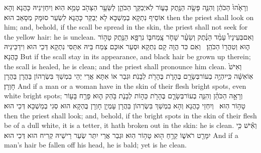 {וְרָאָ֙הוּ֙ הַכֹּהֵ֔ן וְהִנֵּ֛ה פָּשָׂ֥ה הַנֶּ֖תֶק בָּע֑וֹר לֹֽא\maqqaf יְבַקֵּ֧ר הַכֹּהֵ֛ן לַשֵּׂעָ֥ר הַצָּהֹ֖ב טָמֵ֥א הֽוּא׃}
{וְיִחְזֵינֵיהּ כָּהֲנָא וְהָא אוֹסֵיף נִתְקָא בְמַשְׁכָּא לָא יְבַקַּר כָּהֲנָא לִשְׂעַר סוּמָּק מְסָאַב הוּא׃}
{then the priest shall look on him; and, behold, if the scall be spread in the skin, the priest shall not seek for the yellow hair: he is unclean.}{}
{וְאִם\maqqaf בְּעֵינָיו֩ עָמַ֨ד הַנֶּ֜תֶק וְשֵׂעָ֨ר שָׁחֹ֧ר צָֽמַח\maqqaf בּ֛וֹ נִרְפָּ֥א הַנֶּ֖תֶק טָה֣וֹר ה֑וּא וְטִהֲר֖וֹ הַכֹּהֵֽן׃ \setuma }
{וְאִם כִּד הֲוָה קָם נִתְקָא וּסְעַר אוּכָּם צְמַח בֵּיהּ אִתַּסִּי נִתְקָא דְּכֵי הוּא וִידַכֵּינֵיהּ כָּהֲנָא׃}
{But if the scall stay in its appearance, and black hair be grown up therein; the scall is healed, he is clean; and the priest shall pronounce him clean.}{}
{וְאִישׁ֙ אֽוֹ\maqqaf אִשָּׁ֔ה כִּֽי\maqqaf יִהְיֶ֥ה בְעוֹר\maqqaf בְּשָׂרָ֖ם בֶּהָרֹ֑ת בֶּהָרֹ֖ת לְבָנֹֽת׃}
{וּגְבַר אוֹ אִתָּא אֲרֵי יְהֵי בִמְשַׁךְ בִּשְׂרְהוֹן בַּהֲרָן בַּהֲרָן חָוְרָן׃}
{And if a man or a woman have in the skin of their flesh bright spots, even white bright spots;}{}
{וְרָאָ֣ה הַכֹּהֵ֗ן וְהִנֵּ֧ה בְעוֹר\maqqaf בְּשָׂרָ֛ם בֶּהָרֹ֖ת כֵּה֣וֹת לְבָנֹ֑ת בֹּ֥הַק ה֛וּא פָּרַ֥ח בָּע֖וֹר טָה֥וֹר הֽוּא׃ \setuma }
{וְיִחְזֵי כָהֲנָא וְהָא בִמְשַׁךְ בִּשְׂרְהוֹן בַּהֲרָן עָמְיָן חָוְרָן בֻּהְקָא הוּא סְגִי בְמַשְׁכָּא דְּכֵי הוּא׃}
{then the priest shall look; and, behold, if the bright spots in the skin of their flesh be of a dull white, it is a tetter, it hath broken out in the skin: he is clean.}{}
{וְאִ֕ישׁ כִּ֥י יִמָּרֵ֖ט רֹאשׁ֑וֹ קֵרֵ֥חַ ה֖וּא טָה֥וֹר הֽוּא׃}
{וּגְבַר אֲרֵי יִתַּר שְׂעַר רֵישֵׁיהּ קְרִיח הוּא דְּכֵי הוּא׃}
{And if a man’s hair be fallen off his head, he is bald; yet is he clean.}{}
